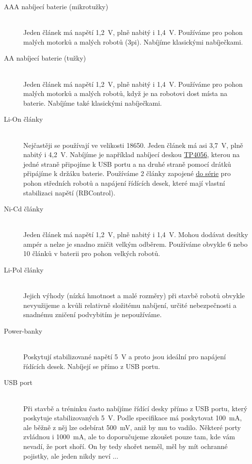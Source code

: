 \begin{description}
	
\item[AAA nabíjecí baterie (mikrotužky)]~\\ 
Jeden článek má napětí 1,2~V, plně nabitý i 1,4~V. 
Používáme pro pohon malých motorků a malých robotů (3pi). 
Nabíjíme klasickými nabíječkami. 

\item[AA nabíjecí baterie (tužky)]~\\ 
Jeden článek má napětí 1,2~V, plně nabitý i 1,4~V. 
Používáme pro pohon malých motorků a malých robotů, když je na robotovi dost místa na baterie. 
Nabíjíme také klasickými nabíječkami.

\item[Li-On články]~\\  
Nejčastěji se používají ve velikosti 18650. Jeden článek má asi 3,7~V, plně nabitý i 4,2~V. 
Nabíjíme je například nabíjecí deskou \href{https://laskarduino.cz/napajeni-zdroje/230501-nabijecka-li-ion-clanku-tp4056.html?gclid=EAIaIQobChMI5_DTrqTA3QIVUeR3Ch1GTwayEAQYASABEgJGz_D_BwE}{TP4056}, kterou na jedné straně připojíme k USB portu a na druhé straně pomocí drátků připájíme k držáku baterie. 
Používáme 2 články zapojené \hyperref[seriove]{do série} pro pohon středních robotů a napájení řídících desek, které mají vlastní stabilizaci napětí (RBControl).   

\item[Ni-Cd články]~\\ 
Jeden článek má napětí 1,2~V, plně nabitý i 1,4~V.
Mohou dodávat desítky ampér a nelze je snadno zničit velkým odběrem.
Používáme obvykle 6 nebo 10 článků v baterii pro pohon velkých robotů.  

\item[Li-Pol články]~\\ 
Jejich výhody (nízká hmotnost a malé rozměry) při stavbě robotů obvykle nevyužijeme a kvůli relativně složitému nabíjení, určité nebezpečnosti a snadnému zničení podvybitím je nepoužíváme. 

\item[Power-banky]~\\ 
Poskytují stabilizované napětí 5~V a proto jsou ideální pro napájení řídících desek. 
Nabíjejí se přímo z USB portu. 


\item[USB port]~\\ 
Při stavbě a tréninku často nabíjíme řídící desky přímo z USB portu, který poskytuje stabilizovaných 5~V. 
Podle specifikace má poskytovat 100~mA, ale běžně z něj lze odebírat 500~mV, aniž by mu to vadilo. 
Některé porty zvládnou i 1000~mA, ale to doporučujeme zkoušet pouze tam, kde vám nevadí, že port shoří. 
On by tedy shořet neměl, měl by mít ochranné pojistky, ale jeden nikdy neví ... 

\end{description}

